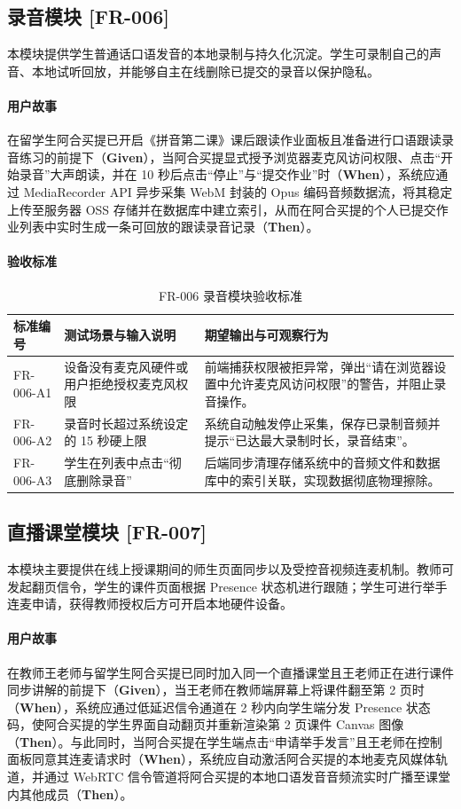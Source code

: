 \subsection{录音模块 [FR-006]}
本模块提供学生普通话口语发音的本地录制与持久化沉淀。学生可录制自己的声音、本地试听回放，并能够自主在线删除已提交的录音以保护隐私。
\paragraph{用户故事}
在留学生阿合买提已开启《拼音第二课》课后跟读作业面板且准备进行口语跟读录音练习的前提下（\textbf{Given}），当阿合买提显式授予浏览器麦克风访问权限、点击“开始录音”大声朗读，并在 10 秒后点击“停止”与“提交作业”时（\textbf{When}），系统应通过 MediaRecorder API 异步采集 WebM 封装的 Opus 编码音频数据流，将其稳定上传至服务器 OSS 存储并在数据库中建立索引，从而在阿合买提的个人已提交作业列表中实时生成一条可回放的跟读录音记录（\textbf{Then}）。
\paragraph{验收标准}
\begin{table}[H]
\centering
\caption{FR-006 录音模块验收标准}
\begin{tabularx}{\textwidth}{l p{5.5cm} X}
\toprule
\textbf{标准编号} & \textbf{测试场景与输入说明} & \textbf{期望输出与可观察行为} \\
\midrule
FR-006-A1 & 设备没有麦克风硬件或用户拒绝授权麦克风权限 & 前端捕获权限被拒异常，弹出“请在浏览器设置中允许麦克风访问权限”的警告，并阻止录音操作。 \\
FR-006-A2 & 录音时长超过系统设定的 15 秒硬上限 & 系统自动触发停止采集，保存已录制音频并提示“已达最大录制时长，录音结束”。 \\
FR-006-A3 & 学生在列表中点击“彻底删除录音” & 后端同步清理存储系统中的音频文件和数据库中的索引关联，实现数据彻底物理擦除。 \\
\bottomrule
\end{tabularx}
\end{table}

\subsection{直播课堂模块 [FR-007]}
本模块主要提供在线上授课期间的师生页面同步以及受控音视频连麦机制。教师可发起翻页信令，学生的课件页面根据 Presence 状态机进行跟随；学生可进行举手连麦申请，获得教师授权后方可开启本地硬件设备。
\paragraph{用户故事}
在教师王老师与留学生阿合买提已同时加入同一个直播课堂且王老师正在进行课件同步讲解的前提下（\textbf{Given}），当王老师在教师端屏幕上将课件翻至第 2 页时（\textbf{When}），系统应通过低延迟信令通道在 2 秒内向学生端分发 Presence 状态码，使阿合买提的学生界面自动翻页并重新渲染第 2 页课件 Canvas 图像（\textbf{Then}）。与此同时，当阿合买提在学生端点击“申请举手发言”且王老师在控制面板同意其连麦请求时（\textbf{When}），系统应自动激活阿合买提的本地麦克风媒体轨道，并通过 WebRTC 信令管道将阿合买提的本地口语发音音频流实时广播至课堂内其他成员（\textbf{Then}）。
